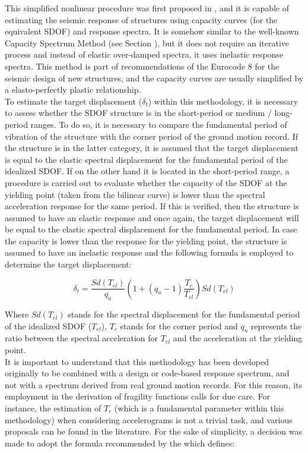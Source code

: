 This simplified nonlinear procedure was first proposed in \citet{Fajfar1996N2}, and it is capable of estimating the seismic response of structures using capacity curves (for the equivalent SDOF) and response spectra. It is somehow similar to the well-known Capacity Spectrum Method (see Section ), but it does not require an iterative process and instead of elastic over-damped spectra, it uses inelastic response spectra. This method is part of recommendations of the Eurocode 8 \citep{CEN2005} for the seismic design of new structures, and the capacity curves are usually simplified by a elasto-perfectly plastic relationship.\\

To estimate the target displacement ($\delta_t$) within this methodology, it is necessary to assess whether the SDOF structure is in the short-period or medium / long-period ranges. To do so, it is necessary to compare the fundamental period of vibration of the structure with the corner period of the ground motion record. If the structure is in the latter category, it is assumed that the target displacement is equal to the elastic spectral displacement for the fundamental period of the idealized SDOF. If on the other hand it is located in the short-period range, a procedure is carried out to evaluate whether the capacity of the SDOF at the yielding point (taken from the bilinear curve) is lower than the spectral acceleration response for the same period. If this is verified, then the structure is assumed to have an elastic response and once again, the target displacement will be equal to the elastic spectral displacement for the fundamental period. In case the capacity is lower than the response for the yielding point, the structure is assumed to have an inelastic response and the following formula is employed to determine the target displacement:

\begin{equation}
\delta_t = \frac{Sd(T_{el})}{q_u}\left(1+(q_u-1)\frac{T_c}{T_{el}}\right)Sd(T_{el})
\end{equation}

Where $Sd(T_{el})$ stands for the spectral displacement for the fundamental period of the idealized SDOF ($T_{el}$), $T_c$ stands for the corner period and $q_u$ represents the ratio between the spectral acceleration for $T_{el}$ and the acceleration at the yielding point.\\

It is important to understand that this methodology has been developed originally to be combined with a design or code-based response spectrum, and not with a spectrum derived from real ground motion records. For this reason, its employment in the derivation of fragility functions calls for due care. For instance, the estimation of $T_c$ (which is a fundamental parameter within this methodology) when considering accelerograms is not a trivial task, and various proposals can be found in the literature. For the sake of simplicity, a decision was made to adopt the formula recommended by the \cite{ASCE2010} which defines:

